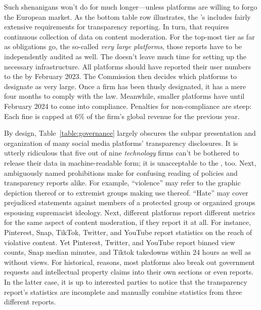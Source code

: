 Such shenanigans won't do for much longer---unless platforms are willing to
forgo the European market. As the bottom table row illustrates, the 's 
includes fairly extensive requirements for transparency reporting. In turn, that
requires continuous collection of data on content moderation. For the top-most
tier as far as obligations go, the so-called \emph{very large platforms}, those
reports have to be independently audited as well. The  doesn't leave much
time for setting up the necessary infrastructure. All platforms should have
reported their user numbers to the  by February 2023. The Commission then
decides which platforms to designate as very large. Once a firm has been thusly
designated, it has a mere four months to comply with the law. Meanwhile, smaller
platforms have until February 2024 to come into compliance. Penalties for
non-compliance are steep: Each fine is capped at 6\% of the firm's global
revenue for the previous year.

By design, Table~\ref{table:governance} largely obscures the subpar presentation
and organization of many social media platforms' transparency disclosures. It is
utterly ridiculous that five out of nine \emph{technology} firms can't be
bothered to release their data in machine-readable form; it is unacceptable to
the , too. Next, ambiguously named prohibitions make for confusing reading of
policies and transparency reports alike. For example, ``violence'' may refer to
the graphic depiction thereof or to extremist groups making use thereof.
``Hate'' may cover prejudiced statements against members of a protected group or
organized groups espousing supremacist ideology. Next, different platforms
report different metrics for the same aspect of content moderation, if they
report it at all. For instance, Pinterest, Snap, TikTok, Twitter, and YouTube
report statistics on the reach of violative content. Yet Pinterest, Twitter, and
YouTube report binned view counts, Snap median minutes, and Tiktok takedowns
within 24 hours as well as without views. For historical, reasons, most
platforms also break out government requests and intellectual property claims
into their own sections or even reports. In the latter case, it is up to
interested parties to notice that the transparency report's statistics are
incomplete and manually combine statistics from three different reports.

